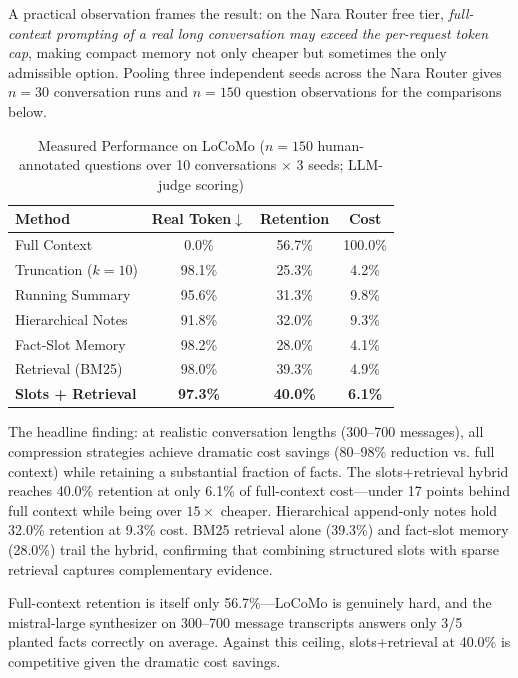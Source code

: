 \documentclass[conference]{IEEEtran}
\begin{document}
A practical observation frames the result: on the Nara Router free tier,
\emph{full-context prompting of a real long conversation may exceed the
per-request token cap}, making compact memory not only cheaper but sometimes
the only admissible option. Pooling three independent seeds across the Nara Router gives $n=30$ conversation
runs and $n=150$ question observations for the comparisons below.

\begin{table}[h]
\centering
\caption{Measured Performance on LoCoMo ($n=150$ human-annotated questions over 10 conversations $\times$ 3 seeds; LLM-judge scoring)}
\label{tab:results}
\scriptsize
\setlength{\tabcolsep}{3pt}
\begin{tabular}{lccc}
\toprule
\textbf{Method} & \textbf{Real Token$\downarrow$} & \textbf{Retention} & \textbf{Cost} \\
\midrule
Full Context & 0.0\% & 56.7\% & 100.0\% \\
Truncation ($k{=}10$) & 98.1\% & 25.3\% & 4.2\% \\
Running Summary & 95.6\% & 31.3\% & 9.8\% \\
Hierarchical Notes & 91.8\% & 32.0\% & 9.3\% \\
Fact-Slot Memory & 98.2\% & 28.0\% & 4.1\% \\
Retrieval (BM25) & 98.0\% & 39.3\% & 4.9\% \\
\textbf{Slots + Retrieval} & \textbf{97.3\%} & \textbf{40.0\%} & \textbf{6.1\%} \\
\bottomrule
\end{tabular}
\end{table}

The headline finding: at realistic conversation lengths (300--700 messages),
all compression strategies achieve dramatic cost savings (80--98\% reduction vs.
full context) while retaining a substantial fraction of facts. The
slots+retrieval hybrid reaches 40.0\% retention at
only 6.1\% of full-context cost---under 17 points behind full context
while being over $15\times$ cheaper. Hierarchical append-only notes hold 32.0\%
retention at 9.3\% cost. BM25 retrieval alone (39.3\%) and fact-slot memory
(28.0\%) trail the hybrid, confirming that combining structured slots with
sparse retrieval captures complementary evidence.

Full-context retention is itself only 56.7\%---LoCoMo is genuinely hard, and
the mistral-large synthesizer on 300--700 message transcripts answers only 3/5
planted facts correctly on average. Against this ceiling, slots+retrieval at
40.0\% is competitive given the dramatic cost savings.
\end{document}
